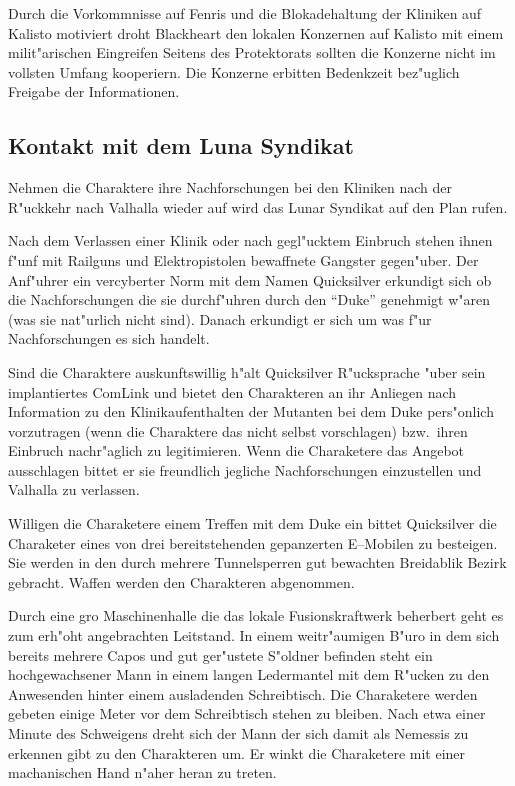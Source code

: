 Durch die Vorkommnisse auf Fenris und die Blokadehaltung der Kliniken auf Kalisto motiviert droht Blackheart den lokalen Konzernen auf Kalisto mit einem milit"arischen Eingreifen Seitens des Protektorats sollten die Konzerne nicht im vollsten Umfang kooperiern. Die Konzerne erbitten Bedenkzeit bez"uglich Freigabe der Informationen.

\subsection{Kontakt mit dem Luna Syndikat}

Nehmen die Charaktere ihre Nachforschungen bei den Kliniken nach der R"uckkehr nach Valhalla wieder auf wird das Lunar Syndikat auf den Plan rufen.

Nach dem Verlassen einer Klinik oder nach gegl"ucktem Einbruch stehen ihnen f"unf mit Railguns und Elektropistolen bewaffnete Gangster gegen"uber. Der Anf"uhrer ein vercyberter Norm mit dem Namen Quicksilver erkundigt sich ob die Nachforschungen die sie durchf"uhren durch den ``Duke'' genehmigt w"aren (was sie nat"urlich nicht sind). Danach erkundigt er sich um was f"ur Nachforschungen es sich handelt.

Sind die Charaktere auskunftswillig h"alt Quicksilver R"ucksprache "uber sein implantiertes ComLink und bietet den Charakteren an ihr Anliegen nach Information zu den Klinikaufenthalten der Mutanten bei dem Duke pers"onlich vorzutragen (wenn die Charaktere das nicht selbst vorschlagen) bzw.~ihren Einbruch nachr"aglich zu legitimieren. Wenn die Charaketere das Angebot ausschlagen bittet er sie freundlich jegliche Nachforschungen einzustellen und Valhalla zu verlassen.

Willigen die Charaketere einem Treffen mit dem Duke ein bittet Quicksilver die Charaketer eines von drei bereitstehenden gepanzerten E--Mobilen zu besteigen. Sie werden in den durch mehrere Tunnelsperren gut bewachten Breidablik Bezirk gebracht. Waffen werden den Charakteren abgenommen.

Durch eine gro\3 Maschinenhalle die das lokale Fusionskraftwerk beherbert geht es zum erh"oht angebrachten Leitstand. In einem weitr"aumigen B"uro in dem sich bereits mehrere Capos und gut ger"ustete S"oldner befinden steht
ein hochgewachsener Mann in einem langen Ledermantel mit dem R"ucken zu den Anwesenden hinter einem ausladenden Schreibtisch. Die Charaketere werden gebeten einige Meter vor dem Schreibtisch stehen zu bleiben. Nach etwa einer Minute des Schweigens dreht sich der Mann der sich damit als Nemessis zu erkennen gibt zu den Charakteren um. Er winkt die Charaketere mit einer machanischen Hand n"aher heran zu treten.


